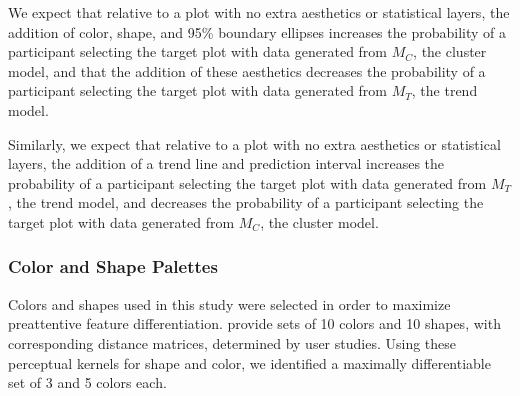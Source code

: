 \documentclass[12pt]{article}\usepackage[]{graphicx}\usepackage[]{color}
\begin{document}
\afterpage{\clearpage}

We expect that relative to a plot with no extra aesthetics or statistical layers, the addition of color, shape, and 95\% boundary ellipses increases the probability of a participant selecting the target plot with data generated from $M_C$, the cluster model, and that the addition of these aesthetics  decreases the probability of a participant selecting the target plot with data generated from $M_T$, the trend model. 

Similarly, we expect that relative to a plot with no extra aesthetics or statistical layers, the addition of a trend line and prediction interval  increases the probability of a participant selecting the target plot with data generated from $M_T$, the trend model, and decreases the probability of a participant selecting the target plot with data generated from $M_C$, the cluster model.

\subsubsection{Color and Shape Palettes}
Colors and shapes used in this study were selected in order to maximize preattentive feature differentiation. \citet{heer:2014} provide sets of 10 colors and 10 shapes, with corresponding distance matrices, determined by user studies. Using these perceptual kernels for shape and color, we identified a maximally differentiable set of 3 and 5 colors each. 
\end{document}
